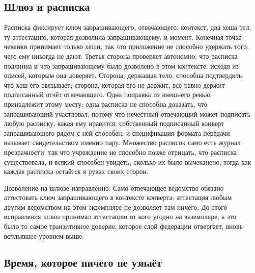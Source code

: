 \subsection{Шлюз и расписка}

Расписка фиксирует ключ запрашивающего, отвечающего, контекст, два хеша тел, ту аттестацию,
которая дозволила запрашивающему, и момент. Конечная точка чеканки принимает только хеши, так что
приложение не способно удержать того, чего ему никогда не дают. Третья сторона проверяет автономно,
что расписка подлинна и что запрашивающему было дозволено в этом контексте, исходя из описей,
которым она доверяет. Сторона, держащая тело, способна подтвердить, что хеш его связывает; сторона,
которая его не держит, всё равно держит подписанный отчёт отвечающего. Одна поправка из внешнего
ревью принадлежит этому месту: одна расписка не способна доказать, что запрашивающий участвовал,
потому что нечестный отвечающий может подписать любую расписку, какая ему нравится; собственный
подписанный конверт запрашивающего рядом с ней способен, и спецификация формата передачи называет
свидетельством именно пару. Множество расписок само есть журнал прозрачности, так что учреждение не
способно позже отрицать, что расписка существовала, и всякий способен увидеть, сколько их было
вычеканено, тогда как каждая расписка остаётся в руках своих сторон. \sImpl


Дозволение на шлюзе направленно. Само отвечающее ведомство обязано
аттестовать ключ запрашивающего в контексте конверта; аттестация любым другим ведомством на этом
экземпляре не дозволяет там ничего. До этого исправления шлюз принимал аттестацию от кого угодно на
экземпляре, а это было то самое транзитивное доверие, которое слой федерации отвергает, вновь
всплывшее уровнем выше. \sImpl

\subsection{Время, которое ничего не узнаёт}

